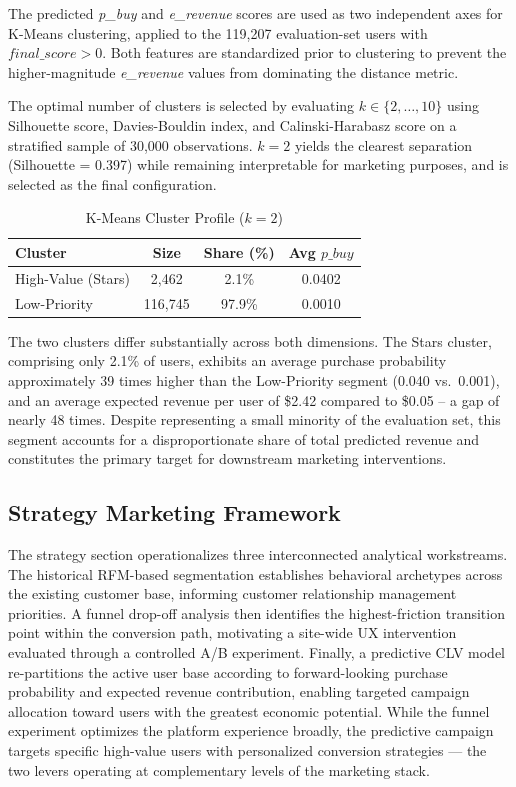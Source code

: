 \documentclass[conference]{IEEEtran}
\begin{document}
The predicted \textit{p\_buy} and \textit{e\_revenue} scores are used as two
independent axes for K-Means clustering, applied to the 119,207
evaluation-set users with $\textit{final\_score} > 0$. Both
features are standardized prior to
clustering to prevent the higher-magnitude \textit{e\_revenue} values
from dominating the distance metric.

The optimal number of clusters is selected by evaluating $k \in
\{2, \ldots, 10\}$ using Silhouette score, Davies-Bouldin index,
and Calinski-Harabasz score on a stratified sample of 30,000
observations. $k = 2$ yields the clearest separation (Silhouette
= 0.397) while remaining interpretable for marketing purposes,
and is selected as the final configuration.

\begin{table}[H]
\centering
\caption{K-Means Cluster Profile ($k = 2$)}
\label{tab:kmeans_profile}
\renewcommand{\arraystretch}{1.2}
\setlength{\tabcolsep}{5pt}
\footnotesize
\begin{tabular}{|l c c c|}
\hline
\textbf{Cluster} & \textbf{Size} & \textbf{Share (\%)}
  & \textbf{Avg $p\_buy$} \\
\hline
High-Value (Stars)
  & 2{,}462 & 2.1\% & 0.0402 \\
\hline
Low-Priority
  & 116{,}745 & 97.9\% & 0.0010 \\
\hline
\end{tabular}
\end{table}

The two clusters differ substantially across both dimensions. The
Stars cluster, comprising only 2.1\% of users, exhibits an
average purchase probability approximately 39 times higher than the
Low-Priority segment (0.040 vs.\ 0.001), and an average expected
revenue per user of \$2.42 compared to \$0.05 -- a gap of nearly
48 times. Despite representing a small minority of the evaluation
set, this segment accounts for a disproportionate share of total
predicted revenue and constitutes the primary target for downstream
marketing interventions.

\subsection{Strategy Marketing Framework}
The strategy section operationalizes three interconnected analytical workstreams. The historical RFM-based segmentation establishes behavioral archetypes across the existing customer base, informing customer relationship management priorities. A funnel drop-off analysis then identifies the highest-friction transition point within the conversion path, motivating a site-wide UX intervention evaluated through a controlled A/B experiment. Finally, a predictive CLV model re-partitions the active user base according to forward-looking purchase probability and expected revenue contribution, enabling targeted campaign allocation toward users with the greatest economic potential. While the funnel experiment optimizes the platform experience broadly, the predictive campaign targets specific high-value users with personalized conversion strategies — the two levers operating at complementary levels of the marketing stack.
\end{document}
